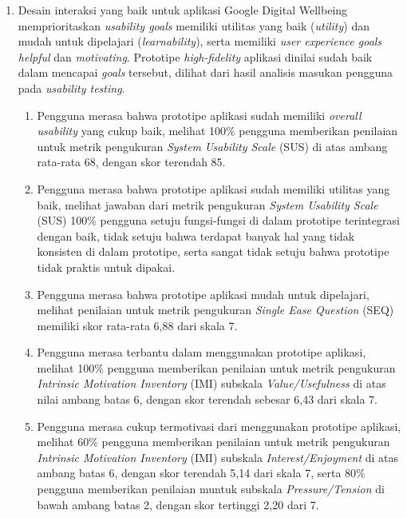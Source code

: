 \begin{enumerate}
  \item Desain interaksi yang baik untuk aplikasi Google Digital Wellbeing memprioritaskan \textit{usability goals} memiliki utilitas yang baik (\textit{utility}) dan mudah untuk dipelajari (\textit{learnability}), serta memiliki \textit{user experience goals} \textit{helpful} dan \textit{motivating}. Prototipe \textit{high-fidelity} aplikasi dinilai sudah baik dalam mencapai \textit{goals} tersebut, dilihat dari hasil analisis masukan pengguna pada \textit{usability testing}.
    \begin{enumerate}[label=\alph*.]
      \item Pengguna merasa bahwa prototipe aplikasi sudah memiliki \textit{overall usability} yang cukup baik, melihat 100\% pengguna memberikan penilaian untuk metrik pengukuran \textit{System Usability Scale} (SUS) di atas ambang rata-rata 68, dengan skor terendah 85. 
      
      \item Pengguna merasa bahwa prototipe aplikasi sudah memiliki utilitas yang baik, melihat jawaban dari metrik pengukuran \textit{System Usability Scale} (SUS) 100\% pengguna setuju fungsi-fungsi di dalam prototipe terintegrasi dengan baik, tidak setuju bahwa terdapat banyak hal yang tidak konsisten di dalam prototipe, serta sangat tidak setuju bahwa prototipe tidak praktis untuk dipakai. 
      
      \item Pengguna merasa bahwa prototipe aplikasi mudah untuk dipelajari, melihat penilaian untuk metrik pengukuran \textit{Single Ease Question} (SEQ) memiliki skor rata-rata 6,88 dari skala 7.
      
      \item Pengguna merasa terbantu dalam menggunakan prototipe aplikasi, melihat 100\% pengguna memberikan penilaian untuk metrik pengukuran \textit{Intrinsic Motivation Inventory} (IMI) subskala \textit{Value/Usefulness} di atas nilai ambang batas 6, dengan skor terendah sebesar 6,43 dari skala 7.
      
      \item Pengguna merasa cukup termotivasi dari menggunakan prototipe aplikasi, melihat 60\% pengguna memberikan penilaian untuk metrik pengukuran \textit{Intrinsic Motivation Inventory} (IMI) subskala \textit{Interest/Enjoyment} di atas ambang batas 6, dengan skor terendah 5,14 dari skala 7, serta 80\% pengguna memberikan penilaian muntuk subskala \textit{Pressure/Tension} di bawah ambang batas 2, dengan skor tertinggi 2,20 dari 7.
        

\end{enumerate}
\end{enumerate}
